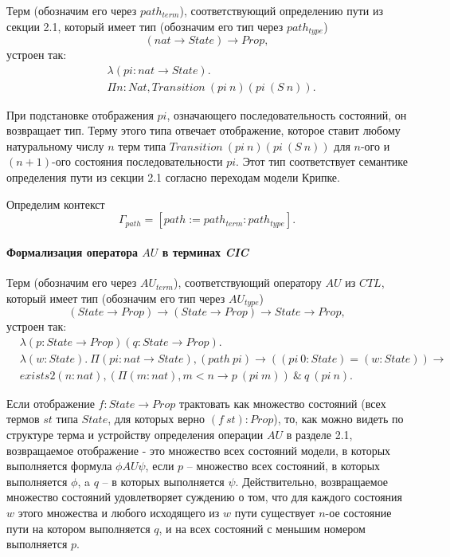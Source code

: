\documentclass[12pt]{article}
\begin{document}
Терм (обозначим его через $path_{term}$), соответствующий определению пути из секции 2.1, который имеет тип (обозначим его тип через $path_{type}$) 
$$(nat \xrightarrow{} State) \xrightarrow{} Prop,$$
устроен так:
\begin{align*}
& \lambda (pi : nat \xrightarrow{} State).\\ 
& \Pi n : Nat, Transition\ (pi\ n) (pi\ (S\ n)).
\end{align*}

При подстановке отображения $pi$, означающего последовательность состояний, он возвращает тип. 
Терму этого типа отвечает отображение, которое ставит любому натуральному числу $n$ терм типа $Transition\ (pi\ n) (pi\ (S\ n))$ для $n$-ого и $(n+1)$-ого состояния последовательности $pi$.
Этот тип соответствует семантике определения пути из секции 2.1 согласно переходам модели Крипке.

Определим контекст $$\Gamma_{path} = [path:=path_{term}:path_{type}].$$

\paragraph{Формализация оператора $AU$ в терминах \textit{CIC}}\mbox{}

Терм (обозначим его через $AU_{term}$), соответствующий оператору $AU$ из $CTL$, который имеет тип (обозначим его тип через $AU_{type}$) 
$$ (State \xrightarrow{} Prop) \xrightarrow{} (State \xrightarrow{} Prop) \xrightarrow{} State \xrightarrow{} Prop,$$
устроен так:
\begin{align*}
&\lambda (p : State \xrightarrow{} Prop)(q : State \xrightarrow{} Prop). \\ & \lambda(w : State).\ \Pi (pi : nat \xrightarrow{} State), (path\ pi) \xrightarrow{} ((pi\ 0:State) = (w:State)) \xrightarrow{} \\ 
& exists2 (n : nat), (\Pi (m : nat), m < n \xrightarrow{} p\ (pi\ m))\ \&\ q\ (pi\ n).
\end{align*}

Если отображение $f : State \xrightarrow{} Prop$ трактовать как множество состояний (всех термов $st$ типа $State$, для которых верно $(f\ st) : Prop$), то, как можно видеть по структуре терма и устройству определения операции $AU$ в разделе 2.1, возвращаемое отображение - это множество всех состояний модели, в которых выполняется формула $\phi AU \psi$, если $p$ -- множество всех состояний, в которых выполняется $\phi$, a $q$ -- в которых выполняется $\psi$.
Действительно, возвращаемое множество состояний удовлетворяет суждению о том, что для каждого состояния $w$ этого множества и любого  исходящего из $w$ пути существует $n$-ое состояние пути на котором выполняется $q$, и на всех состояний с меньшим номером выполняется $p$.
\end{document}
